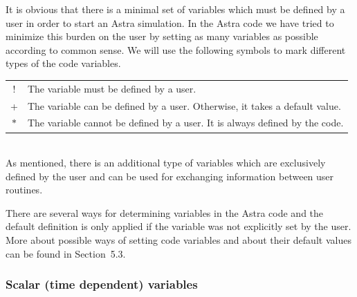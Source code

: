 It is obvious that there is a minimal set of variables which must be
defined by a user in order to start an Astra simulation. 
In the Astra code we have tried to minimize this burden on the user by
setting as many variables as possible according to common sense.
We will use the following symbols to mark different types of the code
variables.\bigskip \\ 
\begin{tabular}{c p{151mm}}
  !  & The variable must be defined by a user. 		\medskip \\
  +  & The variable can be defined by a user. Otherwise, it takes
	a default value. 				\medskip \\
  $*$ & The variable cannot be defined by a user. It is always defined 
	by the code. 					\bigskip \\
\end{tabular}\\
As mentioned, there is an additional type of variables which are
exclusively defined by the user and can be used for exchanging
information between user routines.

There are several ways for determining variables in the Astra
code and the default definition is only applied if the variable
was not explicitly set by the user. 
More about possible ways of setting code variables and about their
default values can be found in Section~5.3.

\subsubsection{Scalar (time dependent) variables}

